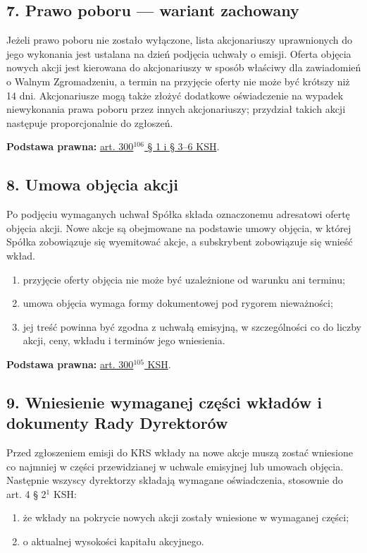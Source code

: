 \documentclass[12pt,a4paper]{report}
\begin{document}
\subsection*{7. Prawo poboru --- wariant zachowany}

Jeżeli prawo poboru nie zostało wyłączone, lista akcjonariuszy uprawnionych do jego wykonania jest ustalana na dzień podjęcia uchwały o emisji. Oferta objęcia nowych akcji jest kierowana do akcjonariuszy w sposób właściwy dla zawiadomień o Walnym Zgromadzeniu, a termin na przyjęcie oferty nie może być krótszy niż 14 dni. Akcjonariusze mogą także złożyć dodatkowe oświadczenie na wypadek niewykonania prawa poboru przez innych akcjonariuszy; przydział takich akcji następuje proporcjonalnie do zgłoszeń.

\textbf{Podstawa prawna:} \href{https://eli.gov.pl/api/acts/DU/2024/18/text.html}{art. 300$^{106}$ § 1 i § 3--6 KSH}.

\subsection*{8. Umowa objęcia akcji}

Po podjęciu wymaganych uchwał Spółka składa oznaczonemu adresatowi ofertę objęcia akcji. Nowe akcje są obejmowane na podstawie umowy objęcia, w której Spółka zobowiązuje się wyemitować akcje, a subskrybent zobowiązuje się wnieść wkład.

\begin{enumerate}
  \item przyjęcie oferty objęcia nie może być uzależnione od warunku ani terminu;
  \item umowa objęcia wymaga formy dokumentowej pod rygorem nieważności;
  \item jej treść powinna być zgodna z uchwałą emisyjną, w szczególności co do liczby akcji, ceny, wkładu i terminów jego wniesienia.
\end{enumerate}

\textbf{Podstawa prawna:} \href{https://eli.gov.pl/api/acts/DU/2024/18/text.html}{art. 300$^{105}$ KSH}.

\subsection*{9. Wniesienie wymaganej części wkładów i dokumenty Rady Dyrektorów}

Przed zgłoszeniem emisji do KRS wkłady na nowe akcje muszą zostać wniesione co najmniej w części przewidzianej w uchwale emisyjnej lub umowach objęcia. Następnie wszyscy dyrektorzy składają wymagane oświadczenia, stosownie do art. 4 § 2$^{1}$ KSH:
\begin{enumerate}
  \item że wkłady na pokrycie nowych akcji zostały wniesione w wymaganej części;
  \item o aktualnej wysokości kapitału akcyjnego.
\end{enumerate}
\end{document}
